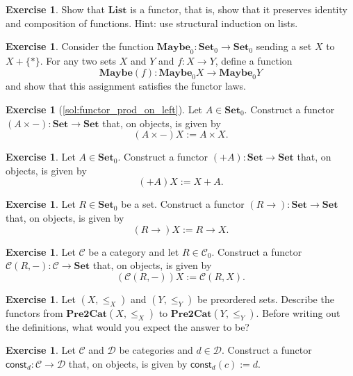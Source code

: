 \documentclass[a4paper,11pt, oneside,titlepage=false]{scrbook}
\theoremstyle{plain}
\theoremstyle{definition}
\newtheorem{exer}[thm]{Exercise}
\newcommand{\Cat}[1]{\mathcal{#1}}
\newcommand{\CC}{\Cat{C}}
\newcommand{\DD}{\Cat{D}}
\newcommand{\Catb}[1]{\mathbf{#1}}
\newcommand{\List}{\Catb{List}}
\newcommand{\Maybe}{\Catb{Maybe}}
\newcommand{\SET}{\Catb{Set}}
\newcommand{\PREtoCAT}{\Catb{Pre2Cat}}
\newcommand{\Ob}[1]{{#1}_0}
\newcommand{\CHom}[3]{{#1}(#2,#3)}
\newcommand{\const}{\ensuremath{\mathsf{const}}}
\begin{document}
\begin{exer}
  Show that $\List$ is a  functor, that is, show that it preserves identity and composition of functions.
  Hint: use structural induction on lists.
\end{exer}

\begin{exer}
  Consider the function $\Ob{\Maybe} : \Ob\SET \to \Ob\SET$ sending a set $X$ to $X + \{*\}$.
  For any two sets $X$ and $Y$ and $f : X \to Y$, define a function
  \[ \Maybe(f) : \Ob\Maybe X \to \Ob\Maybe Y\]
  and show that this assignment satisfies the functor laws.
\end{exer}

\begin{exer}[\cref{sol:functor_prod_on_left}]\label{exer:functor_prod_on_left}
  Let $A \in \Ob\SET$.
  Construct a functor $(A \times -) : \SET \to \SET$ that, on objects, is given by
  \[ (A \times -) X := A \times X. \]
\end{exer}


\begin{exer}
  Let $A \in \Ob\SET$.
  Construct a functor $(+ A) : \SET \to \SET$ that, on objects, is given by
  \[ (+ A) X := X + A. \]
\end{exer}

\begin{exer}
  Let $R \in \Ob\SET$ be a set.
  Construct a functor $(R \to) : \SET \to \SET$ that, on objects, is given by
  \[ (R \to) X := R \to X. \]
\end{exer}

\begin{exer}
  Let $\CC$ be a category and let $R \in \Ob\CC$.
  Construct a functor $\CHom \CC R - : \CC \to \SET$ that, on objects, is given by
  \[ (\CHom \CC R -) X := \CHom \CC R X. \]
\end{exer}


\begin{exer}\label{ex:poset_functors}
  Let $(X,\leq_X)$ and $(Y,\leq_Y)$ be preordered sets.
  Describe the functors from $\PREtoCAT(X,\leq_X)$ to $\PREtoCAT(Y,\leq_Y)$.
  Before writing out the definitions, what would you expect the answer to be?
\end{exer}

\begin{exer}
\label{exer:const-functor}
Let $\CC$ and $\DD$ be categories and $d \in \DD$.
Construct a functor $\const_d : \CC \to \DD$ that, on objects, is given by $\const_d(c) := d$.
\end{exer}
\end{document}
